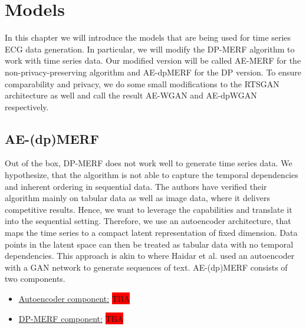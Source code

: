\section{Models}\label{chapter4}
In this chapter we will introduce the models that are being used for time series ECG data generation. In particular, we will modify the DP-MERF algorithm to work with time series data. Our modified version will be called AE-MERF for the non-privacy-preserving algorithm and AE-dpMERF for the DP version. To ensure comparability and privacy, we do some small modifications to the RTSGAN architecture as well and call the result AE-WGAN and AE-dpWGAN respectively.

\subsection{AE-(dp)MERF}
Out of the box, DP-MERF does not work well to generate time series data. We hypothesize, that the algorithm is not able to capture the temporal dependencies and inherent ordering in sequential data. The authors have verified their algorithm mainly on tabular data as well as image data, where it delivers competitive results. Hence, we want to leverage the capabilities and translate it into the sequential setting. Therefore, we use an autoencoder architecture, that maps the time series to a compact latent representation of fixed dimension. Data points in the latent space can then be treated as tabular data with no temporal dependencies. This approach is akin to \parencite{gan_softtext} where Haidar et al. used an autoencoder with a GAN network to generate sequences of text. AE-(dp)MERF consists of two components.
\begin{itemize}
    \item \underline{Autoencoder component:} \colorbox{red}{TBA}
    \item \underline{DP-MERF component:} \colorbox{red}{TBA}
\end{itemize}

